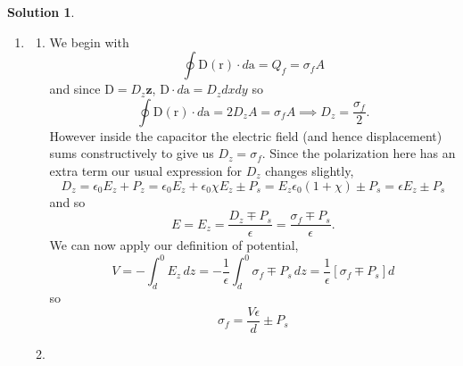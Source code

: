 \documentclass[10pt]{article}
\theoremstyle{definition}
\newtheorem{soln}{Solution}
\newcommand{\uz}{\hat{\mathbf{z}}}
\newcommand{\bv}[1]{\bm{\mathrm{#1}}}
\begin{document}
\begin{soln}~\\
  \begin{enumerate}[label=(\alph*)]
    \item
          \begin{enumerate}[label=\roman*.]
            \item We begin with
                  $$\oint \bv{D}(\bv{r})\cdot d\bv{a}= Q_f=\sigma_fA$$
                  and since $\bv{D}=D_z\uz$, $\bv{D}\cdot d\bv{a}=D_zdxdy$
                  so
                  $$\oint \bv{D}(\bv{r})\cdot d\bv{a}=2D_zA=\sigma_fA\implies D_z=\frac{\sigma_f}{2}.$$
                  However inside the capacitor the electric field (and hence displacement) sums constructively to give us
                  $D_z=\sigma_f.$ Since the polarization here has an extra term our usual expression for $D_z$ changes slightly,
                  $$D_z=\epsilon_0E_z+P_z=\epsilon_0E_z+\epsilon_0\chi E_z\pm P_s=E_z\epsilon_0(1+\chi)\pm P_s=\epsilon E_z\pm P_s$$
                  and so
                  $$E=E_z=\frac{D_z\mp P_s}{\epsilon}=\frac{\sigma_f\mp P_s}{\epsilon}.$$
                  We can now apply our definition of potential,
                  $$V=-\int_d^0E_z\,dz=-\frac{1}{\epsilon}\int_d^0\sigma_f\mp P_s\,dz=\frac{1}{\epsilon}\left[\sigma_f\mp P_s\right]d$$
                  so
                  $$\sigma_f=\frac{V\epsilon}{d}\pm P_s$$



            \item ~\\
\end{enumerate}
\end{enumerate}
\end{soln}
\end{document}
